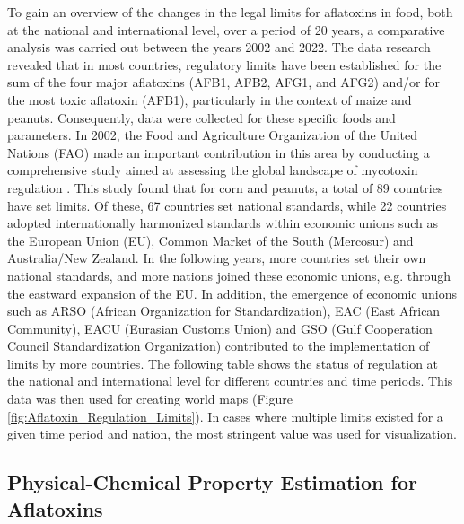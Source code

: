 To gain an overview of the changes in the legal limits for aflatoxins in food, both at the national and international level, over a period of 20 years, a comparative analysis was carried out between the years 2002 and 2022. The data research revealed that in most countries, regulatory limits have been established for the sum of the four major aflatoxins (AFB1, AFB2, AFG1, and AFG2) and/or for the most toxic aflatoxin (AFB1), particularly in the context of maize and peanuts. Consequently, data were collected for these specific foods and parameters. In 2002, the Food and Agriculture Organization of the United Nations (FAO) made an important contribution in this area by conducting a comprehensive study aimed at assessing the global landscape of mycotoxin regulation \citep{van2004worldwide}. This study found that for corn and peanuts, a total of 89 countries have set limits. Of these, 67 countries set national standards, while 22 countries adopted internationally harmonized standards within economic unions such as the European Union (EU), Common Market of the South (Mercosur) and Australia/New Zealand. In the following years, more countries set their own national standards, and more nations joined these economic unions, e.g. through the eastward expansion of the EU. In addition, the emergence of economic unions such as ARSO (African Organization for Standardization), EAC (East African Community), EACU (Eurasian Customs Union) and GSO (Gulf Cooperation Council Standardization Organization) contributed to the implementation of limits by more countries. The following table shows the status of regulation at the national and international level for different countries and time periods. This data was then used for creating world maps (Figure \ref{fig:Aflatoxin_Regulation_Limits}). In cases where multiple limits existed for a given time period and nation, the most stringent value was used for visualization.

\clearpage



\clearpage

\subsection*{Physical-Chemical Property Estimation for Aflatoxins} 
\label{Annex:estimation}

